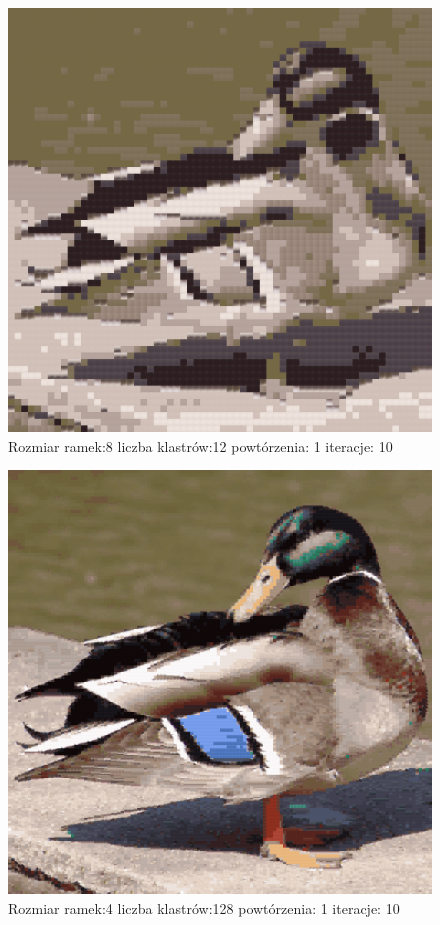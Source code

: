 \documentclass{classrep}
\begin{document}
{{{{                    \begin{figure}[!htbp]
                        \centering
                        \includegraphics[width=\textwidth,width=90mm]{obrazy/duck_R8_K12_P1_It10.png}
                        \caption{Rozmiar ramek:8 liczba klastrów:12 powtórzenia: 1 iteracje: 10 }
                    \end{figure}

                    \begin{figure}[!htbp]
                        \centering
                        \includegraphics[width=\textwidth,width=90mm]{obrazy/duck_R4_K128_P1_It10.png}
                        \caption{Rozmiar ramek:4 liczba klastrów:128 powtórzenia: 1 iteracje: 10 }
                    \end{figure}
                    \FloatBarrier
                }

}}}
\end{document}
